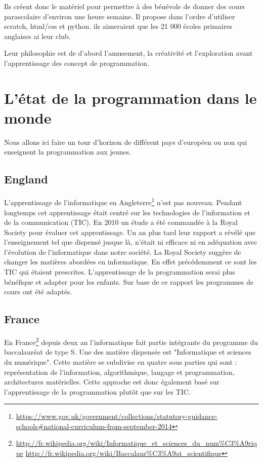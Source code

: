 Ils créent donc le matériel pour permettre à des bénévole de donner des cours parascolaire d'environ une heure semaine. Il propose dans l'ordre d'utiliser scratch, html/css et python. ils aimeraient que les 21 000 écoles primaires anglaises ai leur club.

Leur philosophie est de d'abord l'amusement, la créativité et l'exploration avant l'apprentissage des concept de programmation.

\section{L'état de la programmation dans le monde}
Nous allons ici faire un tour d'horizon de différent pays d'européen ou non qui enseignent la programmation aux jeunes. 
\subsection{England}

L'apprentissage de l'informatique en Angleterre\footnote{\url{https://www.gov.uk/government/collections/statutory-guidance-schools\#national-curriculum-from-september-2014}} n'est pas nouveau. Pendant longtemps cet apprentissage était centré sur les technologies de l'information et de la communication (TIC). En 2010 un étude a été commandée à la Royal Society pour évaluer cet apprentissage. Un an plus tard leur rapport a révélé que l'enseignement tel que dispensé jusque là, n'était ni efficace ni en adéquation avec l'évolution de l'informatique dans notre société. La Royal Society suggère de changer les matières abordées en informatique. En effet précédemment ce sont les TIC qui étaient prescrites. L'apprentissage de la programmation serai plus bénéfique et adapter pour les enfants. Sur base de ce rapport les programmes de cours ont été adaptés.


\subsection{France}
En France\footnote{\url{http://fr.wikipedia.org/wiki/Informatique\_et\_sciences\_du\_num\%C3\%A9rique}
\url{http://fr.wikipedia.org/wiki/Baccalaur\%C3\%A9at\_scientifique}} depuis deux an l'informatique fait partie intégrante du programme du baccalauréat de type S. Une des matière dispensée est "Informatique et sciences du numérique". Cette matière se subdivise en quatre sous parties qui sont : représentation de l'information, algorithmique, langage et programmation, architectures matérielles. Cette approche est donc également basé sur l'apprentissage de la programmation plutôt que sur les TIC.

